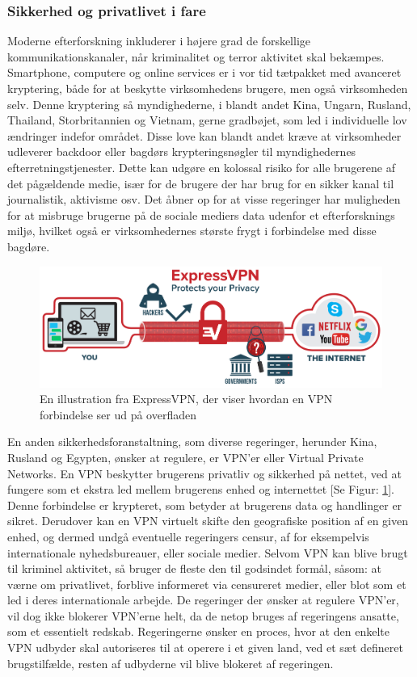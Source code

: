 \subsubsection{Sikkerhed og privatlivet i fare}
Moderne efterforskning inkluderer i højere grad de forskellige kommunikationskanaler, når kriminalitet og terror aktivitet skal bekæmpes. Smartphone, computere og online services er i vor tid tætpakket med avanceret kryptering, både for at beskytte virksomhedens brugere, men også virksomheden selv. Denne kryptering så myndighederne, i blandt andet Kina, Ungarn, Rusland, Thailand, Storbritannien og Vietnam, gerne gradbøjet, som led i individuelle lov ændringer indefor området. Disse love kan blandt andet kræve at virksomheder udleverer backdoor eller bagdørs krypteringsnøgler til myndighedernes efterretningstjenester. Dette kan udgøre en kolossal risiko for alle brugerene af det pågældende medie, især for de brugere der har brug for en sikker kanal til journalistik, aktivisme osv.\cite{FreedomHouseRapport2017} Det åbner op for at visse regeringer har muligheden for at misbruge brugerne på de sociale mediers data udenfor et efterforsknings miljø, hvilket også er virksomhedernes største frygt i forbindelse med disse bagdøre.\\
\begin{figure}[H]
    \centering
    \includegraphics[scale=0.2]{Projectdoc/Problemanalyse/Illustrationer/vpn.png}
    \caption{En illustration fra ExpressVPN, der viser hvordan en VPN forbindelse ser ud på overfladen\cite{ExpressvpnImage}}
    \label{fig:vpn}
\end{figure}
\noindent
En anden sikkerhedsforanstaltning, som diverse regeringer, herunder Kina, Rusland og Egypten\cite{FreedomHouseRapport2017}, ønsker at regulere, er VPN'er eller Virtual Private Networks. En VPN beskytter brugerens privatliv og sikkerhed på nettet, ved at fungere som et ekstra led mellem brugerens enhed og internettet [Se Figur: \ref{fig:vpn}]. Denne forbindelse er krypteret, som betyder at brugerens data og handlinger er sikret.\cite{VPNInfo} Derudover kan en VPN virtuelt skifte den geografiske position af en given enhed, og dermed undgå eventuelle regeringers censur, af for eksempelvis internationale nyhedsbureauer, eller sociale medier. Selvom VPN kan blive brugt til kriminel aktivitet, så bruger de fleste den til godsindet formål, såsom: at værne om privatlivet, forblive informeret via censureret medier, eller blot som et led i deres internationale arbejde. De regeringer der ønsker at regulere VPN'er, vil dog ikke blokerer VPN'erne helt, da de netop bruges af regeringens ansatte, som et essentielt redskab. Regeringerne ønsker en proces, hvor at den enkelte VPN udbyder skal autoriseres til at operere i et given land, ved et sæt defineret brugstilfælde, resten af udbyderne vil blive blokeret af regeringen.\cite{FreedomHouseRapport2017}
